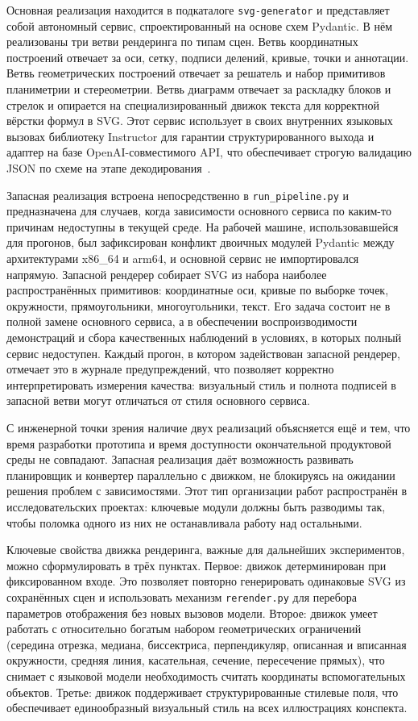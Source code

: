 Основная реализация находится в подкаталоге \texttt{svg-generator} и представляет собой автономный сервис, спроектированный на основе схем Pydantic. В нём реализованы три ветви рендеринга по типам сцен. Ветвь координатных построений отвечает за оси, сетку, подписи делений, кривые, точки и аннотации. Ветвь геометрических построений отвечает за решатель и набор примитивов планиметрии и стереометрии. Ветвь диаграмм отвечает за раскладку блоков и стрелок и опирается на специализированный движок текста для корректной вёрстки формул в SVG. Этот сервис использует в своих внутренних языковых вызовах библиотеку Instructor для гарантии структурированного выхода и адаптер на базе OpenAI\nobreakdash-совместимого API, что обеспечивает строгую валидацию JSON по схеме на этапе декодирования~\cite{Willard2023Outlines}.

Запасная реализация встроена непосредственно в \texttt{run\_pipeline.py} и предназначена для случаев, когда зависимости основного сервиса по каким\nobreakdash-то причинам недоступны в текущей среде. На рабочей машине, использовавшейся для прогонов, был зафиксирован конфликт двоичных модулей Pydantic между архитектурами x86\_64 и arm64, и основной сервис не импортировался напрямую. Запасной рендерер собирает SVG из набора наиболее распространённых примитивов: координатные оси, кривые по выборке точек, окружности, прямоугольники, многоугольники, текст. Его задача состоит не в полной замене основного сервиса, а в обеспечении воспроизводимости демонстраций и сбора качественных наблюдений в условиях, в которых полный сервис недоступен. Каждый прогон, в котором задействован запасной рендерер, отмечает это в журнале предупреждений, что позволяет корректно интерпретировать измерения качества: визуальный стиль и полнота подписей в запасной ветви могут отличаться от стиля основного сервиса.

С инженерной точки зрения наличие двух реализаций объясняется ещё и тем, что время разработки прототипа и время доступности окончательной продуктовой среды не совпадают. Запасная реализация даёт возможность развивать планировщик и конвертер параллельно с движком, не блокируясь на ожидании решения проблем с зависимостями. Этот тип организации работ распространён в исследовательских проектах: ключевые модули должны быть разводимы так, чтобы поломка одного из них не останавливала работу над остальными.

Ключевые свойства движка рендеринга, важные для дальнейших экспериментов, можно сформулировать в трёх пунктах. Первое: движок детерминирован при фиксированном входе. Это позволяет повторно генерировать одинаковые SVG из сохранённых сцен и использовать механизм \texttt{rerender.py} для перебора параметров отображения без новых вызовов модели. Второе: движок умеет работать с относительно богатым набором геометрических ограничений (середина отрезка, медиана, биссектриса, перпендикуляр, описанная и вписанная окружности, средняя линия, касательная, сечение, пересечение прямых), что снимает с языковой модели необходимость считать координаты вспомогательных объектов. Третье: движок поддерживает структурированные стилевые поля, что обеспечивает единообразный визуальный стиль на всех иллюстрациях конспекта.

